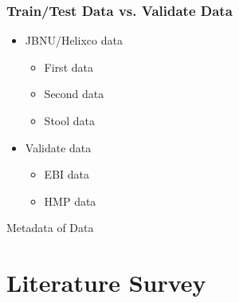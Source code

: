 \documentclass{beamer}
\begin{document}
    \begin{frame}
        \frametitle{Train/Test Data vs. Validate Data}
        \begin{itemize}
            \item JBNU/Helixco data
            \begin{itemize}
                \item First data
                \item Second data
                \item Stool data
            \end{itemize}

            \item Validate data
            \begin{itemize}
                \item EBI data
                \item HMP data
            \end{itemize}
        \end{itemize}

        \begin{table}
            \centering
            \caption{Metadata of Data}
            
        \end{table}
    \end{frame}

    \section{Literature Survey }
\end{document}
